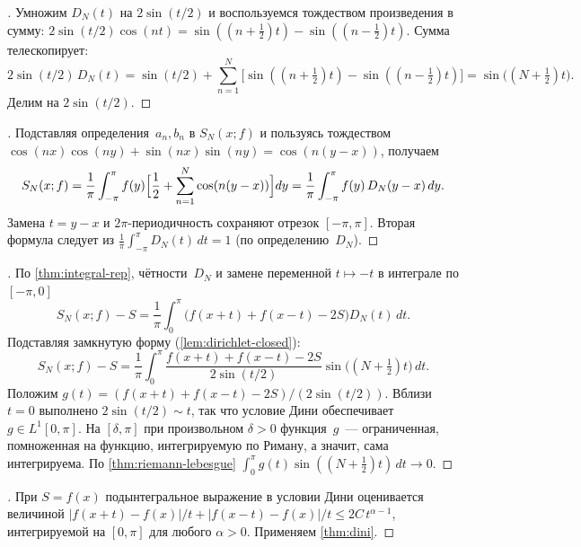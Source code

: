 \begin{proof}[]
Умножим $D_N(t)$ на $2\sin(t/2)$ и воспользуемся тождеством
произведения в сумму:
$2 \sin(t/2) \cos(nt) = \sin((n + \tfrac12) t) - \sin((n - \tfrac12) t)$.
Сумма телескопирует:
\[
  2 \sin(t/2)\, D_N(t) = \sin(t/2) + \sum_{n=1}^{N}\bigl[\sin((n + \tfrac12)t) - \sin((n - \tfrac12) t)\bigr]
  = \sin\bigl((N + \tfrac12)t\bigr).
\]
Делим на $2\sin(t/2)$.
\end{proof}

\begin{proof}[]
Подставляя определения~$a_n, b_n$ в $S_N(x; f)$ и пользуясь
тождеством $\cos(nx)\cos(ny) + \sin(nx)\sin(ny) = \cos(n(y - x))$,
получаем
\[
  S_N(x; f)
  = \frac{1}{\pi} \int_{-\pi}^{\pi} f(y) \Bigl[\frac{1}{2} + \sum_{n=1}^{N} \cos(n(y - x))\Bigr] dy
  = \frac{1}{\pi} \int_{-\pi}^{\pi} f(y)\, D_N(y - x)\, dy.
\]
Замена $t = y - x$ и $2\pi$-периодичность сохраняют отрезок
$[-\pi, \pi]$. Вторая формула следует из
$\frac{1}{\pi} \int_{-\pi}^{\pi} D_N(t)\, dt = 1$ (по определению~$D_N$).
\end{proof}

\begin{proof}[]
По \cref{thm:integral-rep}, чётности~$D_N$ и замене переменной
$t \mapsto -t$ в интеграле по $[-\pi, 0]$
\[
  S_N(x; f) - S
  = \frac{1}{\pi} \int_{0}^{\pi} \bigl(f(x+t) + f(x-t) - 2S\bigr) D_N(t)\, dt.
\]
Подставляя замкнутую форму (\cref{lem:dirichlet-closed}):
\[
  S_N(x; f) - S
  = \frac{1}{\pi} \int_{0}^{\pi} \frac{f(x+t) + f(x-t) - 2S}{2\sin(t/2)} \sin\bigl((N + \tfrac12) t\bigr)\, dt.
\]
Положим $g(t) = (f(x+t) + f(x-t) - 2S)/(2\sin(t/2))$. Вблизи $t = 0$
выполнено $2\sin(t/2) \sim t$, так что условие Дини обеспечивает
$g \in L^1[0, \pi]$. На $[\delta, \pi]$ при произвольном $\delta > 0$
функция~$g$~--- ограниченная, помноженная на функцию, интегрируемую по
Риману, а значит, сама интегрируема. По
\cref{thm:riemann-lebesgue}
$\int_0^{\pi} g(t) \sin((N + \tfrac12) t)\, dt \to 0$.
\end{proof}

\begin{proof}[]
При $S = f(x)$ подынтегральное выражение в условии Дини
оценивается величиной
$|f(x+t) - f(x)|/t + |f(x-t) - f(x)|/t \le 2C\, t^{\alpha - 1}$,
интегрируемой на $[0, \pi]$ для любого $\alpha > 0$. Применяем
\cref{thm:dini}.
\end{proof}

